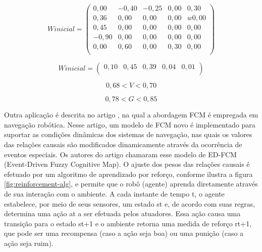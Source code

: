 \begin{equation}\label{W-matrix}
    Winicial=\left(
       \begin{array}{ccccc}
         0,00 & -0,40 & -0,25 & 0,00 & 0,30 \\
         0,36 & 0,00 & 0,00 & 0,00 & w0,00 \\
         0,45 & 0,00 & 0,00 & 0,00 & 0,00 \\
         -0,90 & 0,00 & 0,00 & 0,00 & 0,00 \\
         0,00 & 0,60 & 0,00 & 0,30 & 0,00 \\
       \end{array}
     \right)
\end{equation}

\begin{equation}\label{A-matrix}
    Winicial=\left(
       \begin{array}{ccccc}
         0,10 & 0,45 & 0,39 & 0,04 & 0,01 \\
       \end{array}
     \right)
\end{equation}

\begin{equation}\label{lim-V-adj}
0,68<V<0,70
\end{equation}

\begin{equation}\label{lim-G-adj}
0,78<G<0,85
\end{equation}

Outra aplicação é descrita no artigo \cite{MENDONCA}, na qual a abordagem FCM é empregada em navegação robótica. Nesse artigo, um modelo de FCM novo é implementado para suportar as condições dinâmicas dos sistemas de navegação, nas quais os valores das relações causais são modificados dinamicamente através da ocorrência de eventos especiais. Os autores do artigo chamaram esse modelo de ED-FCM (Event-Driven Fuzzy Cognitive Map). O ajuste dos pesos das relações causais é efetuado por um algoritmo de aprendizado por reforço, conforme ilustra a figura \ref{fig:reinforcement-alg}, e permite que o robô (agente) aprenda diretamente através de sua interação com o ambiente. A cada instante de tempo t, o agente estabelece, por meio de seus sensores, um estado st e, de acordo com suas regras, determina uma ação at a ser efetuada pelos atuadores. Essa ação causa uma transição para o estado st+1 e o ambiente retorna uma medida de reforço rt+1, que pode ser uma recompensa (caso a ação seja boa) ou uma punição (caso a ação seja ruim).

